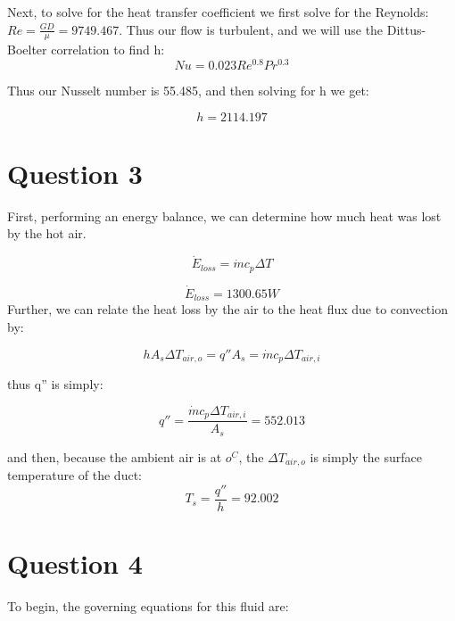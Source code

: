 \documentclass{article}
\begin{document}
Next, to solve for the heat transfer coefficient we first solve for the Reynolds: $Re = \frac{GD}{\mu} = 9749.467$. Thus our flow is turbulent, and we will use the Dittus-Boelter correlation to find h:
\begin{equation}
    Nu = 0.023Re^{0.8}Pr^{0.3}
\end{equation}

Thus our Nusselt number is 55.485, and then solving for h we get:

\begin{equation}
    \boxed{h = 2114.197}
\end{equation}

\section{Question 3}

First, performing an energy balance, we can determine how much heat was lost by the hot air. 

\begin{equation}
    \Dot{E}_{loss} = \Dot{m}c_p\Delta T 
\end{equation}

\begin{equation}
    \boxed{\Dot{E}_{loss} = 1300.65 W}
\end{equation}
Further, we can relate the heat loss by the air to the heat flux due to convection by:

\begin{equation}
    hA_s\Delta T_{air,o} = q''A_s= \Dot{m}c_p\Delta T_{air,i}
\end{equation}

thus q'' is simply:

\begin{equation}
    \boxed{q'' = \frac{\Dot{m}c_p\Delta T_{air,i}}{A_s} = 552.013}
\end{equation}

and then, because the ambient air is at $o^C$, the $\Delta T_{air,o}$ is simply the surface temperature of the duct:
\begin{equation}
    \boxed{T_s = \frac{q''}{h} = 92.002}
\end{equation}

\section{Question 4}

To begin, the governing equations for this fluid are:
\end{document}

